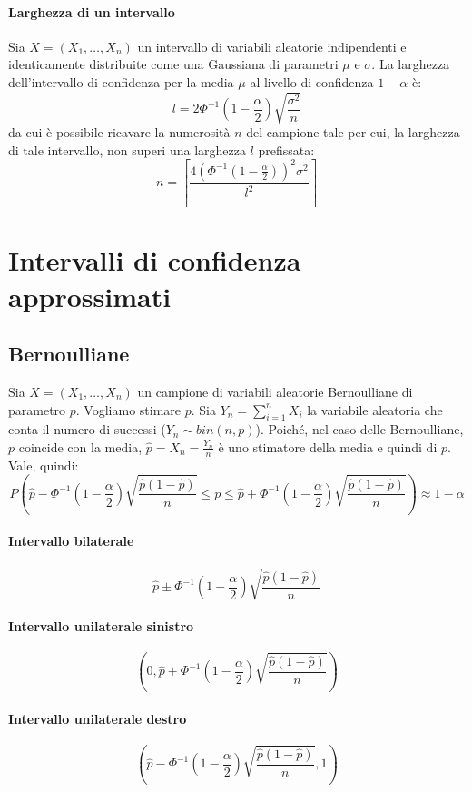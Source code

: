 \documentclass[12pt, a4paper]{report}
\theoremstyle{definition}
\begin{document}
\paragraph{Larghezza di un intervallo}
Sia $X=(X_1,\dots,X_n)$ un intervallo di variabili aleatorie indipendenti e
identicamente distribuite come una Gaussiana di parametri $\mu$ e $\sigma$.
La larghezza dell'intervallo di confidenza per la media $\mu$ al livello di
confidenza $1-\alpha$ è:
\[l=2\Phi^{-1}(1-\frac{\alpha}{2})\sqrt{\frac{\sigma^2}{n}}\]
da cui è possibile ricavare la numerosità $n$ del campione tale per cui, la
larghezza di tale intervallo, non superi una larghezza $l$ prefissata:
\[n=\left\lceil\frac{4(\Phi^{-1}(1-\frac{\alpha}{2}))^2\sigma^2}{l^2}\right\rceil\]

\section{Intervalli di confidenza approssimati}
\subsection{Bernoulliane}
Sia $X=(X_1,\dots,X_n)$ un campione di variabili aleatorie Bernoulliane di parametro
$p$. Vogliamo stimare $p$. Sia $Y_n=\sum_{i=1}^nX_i$ la variabile aleatoria che
conta il numero di successi ($Y_n\sim bin(n,p)$). Poiché, nel caso delle
Bernoulliane, $p$ coincide con la media, $\hat{p}=\bar{X}_n=\frac{Y_n}{n}$ è uno
stimatore della media e quindi di $p$. Vale, quindi:
\[P\left(\hat{p}-\Phi^{-1}\left(1-\frac{\alpha}{2}\right)\sqrt{\frac{\hat{p}(1-
\hat{p})}{n}}\leq p\leq\hat{p}+\Phi^{-1}\left(1-\frac{\alpha}{2}\right)\sqrt{
\frac{\hat{p}(1-\hat{p})}{n}}\right)\approx1-\alpha\]

\paragraph{Intervallo bilaterale}
\[\hat{p}\pm\Phi^{-1}\left(1-\frac{\alpha}{2}\right)\sqrt{\frac{\hat{p}
(1-\hat{p})}{n}}\]
\paragraph{Intervallo unilaterale sinistro}
\[\left(0,\hat{p}+\Phi^{-1}\left(1-\frac{\alpha}{2}\right)\sqrt{\frac{\hat{p}
(1-\hat{p})}{n}}\right)\]
\paragraph{Intervallo unilaterale destro}
\[\left(\hat{p}-\Phi^{-1}\left(1-\frac{\alpha}{2}\right)\sqrt{\frac{\hat{p}
(1-\hat{p})}{n}}, 1\right)\]
\end{document}
